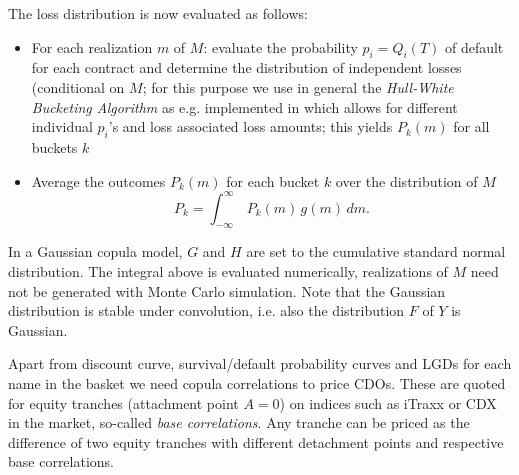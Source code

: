 The loss distribution is now evaluated as follows:
\begin{itemize}
\item For each realization $m$ of $M$: evaluate the probability
  $p_i=Q_i(T)$ of default for each contract and
  determine the distribution of independent losses (conditional on $M$;
  for this purpose we use in general the {\em Hull-White Bucketing Algorithm}
  \cite{HullWhiteBucketing} as e.g. implemented in \cite{QuantLib}
  which allows for different individual $p_i$'s and loss associated loss
  amounts;  this yields $P_k(m)$ for all buckets $k$
\item Average the outcomes $P_k(m)$ for each bucket $k$ over the
  distribution of $M$
$$
P_k = \int_{-\infty}^\infty\,P_k(m)\,g(m)\,dm. \label{copula_2}
$$   
\end{itemize}

In a Gaussian copula model, $G$ and $H$ are set to the cumulative 
standard normal distribution. The integral above is
evaluated numerically, realizations of $M$ need not be generated with
Monte Carlo simulation. Note that the Gaussian distribution is stable
under convolution, i.e. also the distribution $F$ of $Y$ is Gaussian. 


Apart from discount curve, survival/default probability curves and
LGDs for each name in the basket we need copula correlations to
price  CDOs. These are quoted for equity tranches (attachment point
$A=0$) on indices such as iTraxx or CDX in the market, so-called {\em
  base correlations}. Any tranche can be priced as the difference of
two equity tranches with different detachment points and respective
base correlations. 

